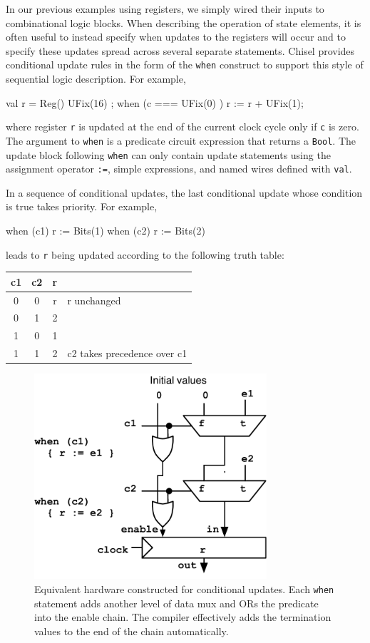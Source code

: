 \documentclass[10pt]{article}
\def\code#1{{\tt #1}}
\begin{document}
In our previous examples using registers, we simply wired their inputs
to combinational logic blocks.  When describing the operation of state
elements, it is often useful to instead specify when updates to the
registers will occur and to specify these updates spread across
several separate statements.  Chisel provides conditional update rules
in the form of the \code{when} construct to support this style of
sequential logic description. For example,
\begin{scala}
val r = Reg() { UFix(16) };
when (c === UFix(0) ) {
  r := r + UFix(1);
}
\end{scala}

\noindent
where register \code{r} is updated at the end of the current clock
cycle only if \verb+c+ is zero.  The argument to \code{when} is a
predicate circuit expression that returns a \code{Bool}.  The update
block following \code{when} can only contain update statements using
the assignment operator \verb+:=+, simple expressions, and named wires
defined with \code{val}.

In a sequence of conditional updates, the last conditional update
whose condition is true takes priority.  For example,
\begin{scala}
when (c1) { r := Bits(1) }
when (c2) { r := Bits(2) }
\end{scala}

\noindent
leads to \code{r} being updated according to the following truth table:
\begin{center}
{\small
\begin{tabular}{|c|c|c|l|}
\hline
c1 & c2  &  r & \\
\hline
0 &  0 & r &  r unchanged \\
0 &  1 & 2 & \\
1 &  0 & 1 & \\
1 &  1 & 2& c2 takes precedence over c1 \\
\hline
\end{tabular}
}
\end{center}

\begin{figure}[h]
\centering
\includegraphics[height=3in]{figs/condupdates.pdf}
\caption{Equivalent hardware constructed for conditional updates.
  Each \code{when} statement adds another level of data mux and ORs
  the predicate into the enable chain.  The compiler effectively adds
  the termination values to the end of the chain automatically.}
\label{fig:condupdates}
\end{figure}
\end{document}
